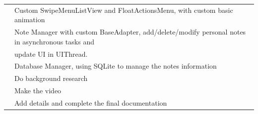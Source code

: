 \documentclass{article}
\begin{document}
\begin{table}[h]
\begin{tabular}{|c|l|}
            \cline{2-2}
            & Custom SwipeMenuListView and FloatActionsMenu, 
            with custom basic animation\\
            \cline{2-2}
            & Note Manager with custom BaseAdapter, 
            add/delete/modify personal notes in asynchronous tasks and \\
            & update UI in UIThread. \\
            \cline{2-2}
            & Database Manager, using SQLite to manage the notes information \\
            \cline{2-2}
            & Do background research \\
            \cline{2-2}
            & Make the video \\
            \cline{2-2}
            & Add details and complete the final documentation \\
            \hline
        \end{tabular}
    \end{table}

    
\end{document}
